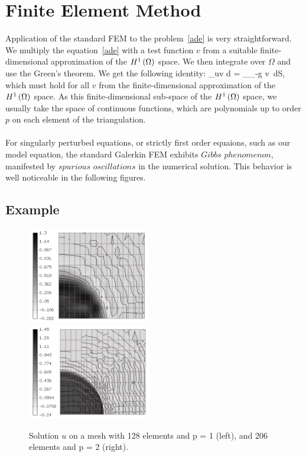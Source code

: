 	\section{Finite Element Method}
Application of the standard FEM to the problem~\eqref{ade} is very straightforward. We multiply the equation~\eqref{ade} with a test function $v$ from a suitable finite-dimensional approximation of the $H^1\left(\Omega\right)$ space. We then integrate over $\Omega$ and use the Green's theorem. We get the following identity:
\be
\int_{\Omega}\lo u\ro \cdot \nabla v d = \int_{\Gamma_-}g v\ dS,
\ee
which must hold for all $v$ from the finite-dimensional approximation of the $H^1\left(\Omega\right)$ space. 
As this finite-dimensional sub-space of the $H^1\left(\Omega\right)$ space, we usually take the space of continuous functions, which are polynomials up to order $p$ on each element of the triangulation.
\paragraph{}
For singularly perturbed equations, or strictly first order equaions, such as our model equation, the standard Galerkin FEM exhibits $Gibbs$ $phenomenon$, manifested by $spurious$ $oscillations$ in the numerical solution. This behavior is well noticeable in the following figures.
		\subsection{Example}
\begin{figure}[H]
\begin{center}
\includegraphics[width=0.48\textwidth]{minor_examples/FEM00.png}\ \ \ 
\includegraphics[width=0.48\textwidth]{minor_examples/FEM01.png}
\end{center}
\vspace{-4mm}
\caption{Solution $u$ on a mesh with 128 elements and p = 1 (left), and 206 elements and p = 2 (right).}
\end{figure}

